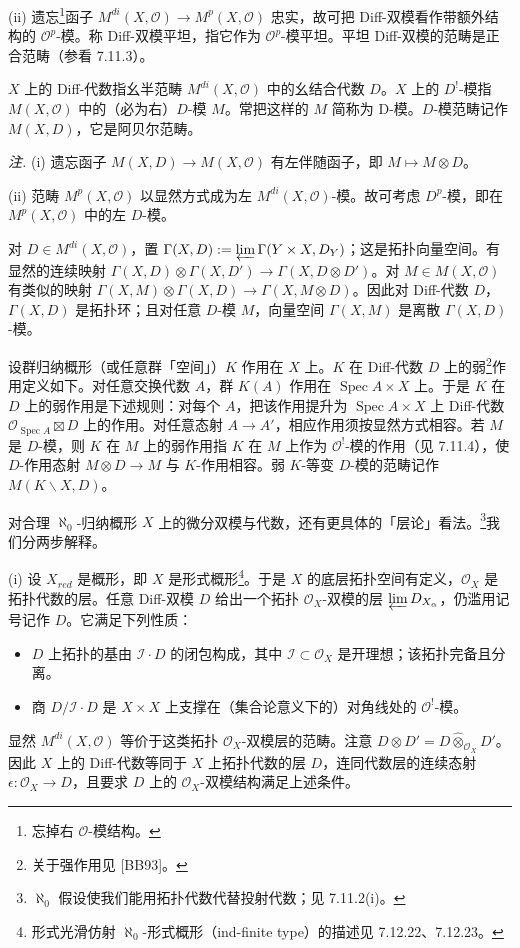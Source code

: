 (ii) 遗忘\footnote{忘掉右 $\mathcal{O}$-模结构。}函子 $M^{di}(X,\mathcal{O})\to M^p(X,\mathcal{O})$ 忠实，故可把 Diff-双模看作带额外结构的 $\mathcal{O}^p$-模。称 Diff-双模平坦，指它作为 $\mathcal{O}^p$-模平坦。平坦 Diff-双模的范畴是正合范畴（参看 7.11.3）。

$X$ 上的 Diff-代数指幺半范畴 $M^{di}(X,\mathcal{O})$ 中的幺结合代数 $D$。$X$ 上的 $D^!$-模指 $M(X,\mathcal{O})$ 中的（必为右）$D$-模 $M$。常把这样的 $M$ 简称为 D-模。$D$-模范畴记作 $M(X,D)$，它是阿贝尔范畴。

\emph{注.} (i) 遗忘函子 $M(X,D)\to M(X,\mathcal{O})$ 有左伴随函子，即 $M\mapsto M\otimes D$。

(ii) 范畴 $M^p(X,\mathcal{O})$ 以显然方式成为左 $M^{di}(X,\mathcal{O})$-模。故可考虑 $D^p$-模，即在 $M^p(X,\mathcal{O})$ 中的左 $D$-模。

对 $D\in M^{di}(X,\mathcal{O})$，置 $\Gamma(X,D):=\varprojlim\Gamma(Y\times X,D_Y)$；这是拓扑向量空间。有显然的连续映射 $\Gamma(X,D)\otimes\Gamma(X,D')\to\Gamma(X,D\otimes D')$。对 $M\in M(X,\mathcal{O})$ 有类似的映射 $\Gamma(X,M)\otimes\Gamma(X,D)\to\Gamma(X,M\otimes D)$。因此对 Diff-代数 $D$，$\Gamma(X,D)$ 是拓扑环；且对任意 $D$-模 $M$，向量空间 $\Gamma(X,M)$ 是离散 $\Gamma(X,D)$-模。

设群归纳概形（或任意群「空间」）$K$ 作用在 $X$ 上。$K$ 在 Diff-代数 $D$ 上的弱\footnote{关于强作用见 [BB93]。}作用定义如下。对任意交换代数 $A$，群 $K(A)$ 作用在 $\operatorname{Spec}A\times X$ 上。于是 $K$ 在 $D$ 上的弱作用是下述规则：对每个 $A$，把该作用提升为 $\operatorname{Spec}A\times X$ 上 Diff-代数 $\mathcal{O}_{\operatorname{Spec}A}\boxtimes D$ 上的作用。对任意态射 $A\to A'$，相应作用须按显然方式相容。若 $M$ 是 $D$-模，则 $K$ 在 $M$ 上的弱作用指 $K$ 在 $M$ 上作为 $\mathcal{O}^!$-模的作用（见 7.11.4），使 $D$-作用态射 $M\otimes D\to M$ 与 $K$-作用相容。弱 $K$-等变 $D$-模的范畴记作 $M(K\backslash X,D)$。

 对合理 $\aleph_0$-归纳概形 $X$ 上的微分双模与代数，还有更具体的「层论」看法。\footnote{$\aleph_0$ 假设使我们能用拓扑代数代替投射代数；见 7.11.2(i)。}我们分两步解释。

(i) 设 $X_{red}$ 是概形，即 $X$ 是形式概形\footnote{形式光滑仿射 $\aleph_0$-形式概形（ind-finite type）的描述见 7.12.22、7.12.23。}。于是 $X$ 的底层拓扑空间有定义，$\mathcal{O}_X$ 是拓扑代数的层。任意 Diff-双模 $D$ 给出一个拓扑 $\mathcal{O}_X$-双模的层 $\varprojlim D_{X_\alpha}$，仍滥用记号记作 $D$。它满足下列性质：
\begin{itemize}[label=--]
\item $D$ 上拓扑的基由 $\mathcal{I}\cdot D$ 的闭包构成，其中 $\mathcal{I}\subset\mathcal{O}_X$ 是开理想；该拓扑完备且分离。
\item 商 $D/\mathcal{I}\cdot D$ 是 $X\times X$ 上支撑在（集合论意义下的）对角线处的 $\mathcal{O}^!$-模。
\end{itemize}
显然 $M^{di}(X,\mathcal{O})$ 等价于这类拓扑 $\mathcal{O}_X$-双模层的范畴。注意 $D\otimes D'=D\hat{\otimes}_{\mathcal{O}_X}D'$。因此 $X$ 上的 Diff-代数等同于 $X$ 上拓扑代数的层 $D$，连同代数层的连续态射 $\epsilon:\mathcal{O}_X\to D$，且要求 $D$ 上的 $\mathcal{O}_X$-双模结构满足上述条件。

